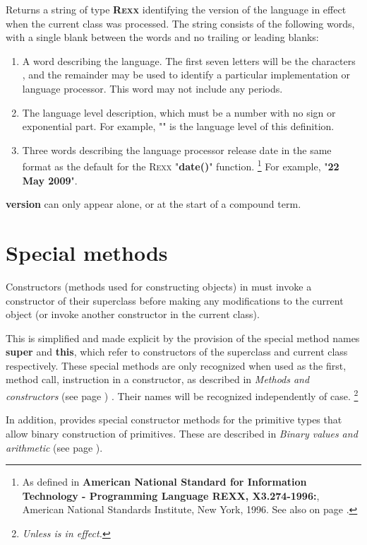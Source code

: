\begin{description}
Returns a string of type \textbf{R\textsc{exx}} identifying the version of the
\nr{} language in effect when the current class was processed.
The string consists of the following words, with a single blank between
the words and no trailing or leading blanks:
\begin{enumerate}
\item A word describing the language.  The first seven letters will be the
characters \textbf{\nr{}}, and the remainder may be used to identify
a particular implementation or language processor.
This word may not include any periods.
\item 
The language level description, which must be a number with no sign or
exponential part.
For example, "\textbf{}" is the language level of this
definition.
\item 
Three words describing the language processor release date in
the same format as the default for the R\textsc{exx} "\textbf{date()}"
function.
\footnote{
As defined in \textbf{American National Standard for Information
Technology - Programming Language REXX, X3.274-1996:}, American
National Standards Institute, New York, 1996. See also
 on page \pageref{refrexxdate}.
}
For example, "\textbf{22 May 2009}".
\end{enumerate}
 \textbf{version} can only appear alone, or at the start of a
compound term.
\end{description}
\section{Special methods}\label{refspecm}
 
Constructors (methods used for constructing objects) in \nr{}
must invoke a constructor of their superclass before making any
modifications to the current object (or invoke another constructor in
the current class).
 
This is simplified and made explicit by the provision of the special
method names \textbf{super} and \textbf{this}, which refer to
constructors of the superclass and current class respectively.  These
special methods are only recognized when used as the first, method call,
instruction in a constructor, as described in
 \emph{Methods and constructors} (see page \pageref{refmethcon}) .
Their names will be recognized independently of case.
\footnote{
\emph{Unless  is in effect.
}
}
 
In addition, \nr{} provides special constructor methods for the
primitive types that allow binary construction of primitives.
These are described in  \emph{Binary values and arithmetic} (see page \pageref{refbincon}).
